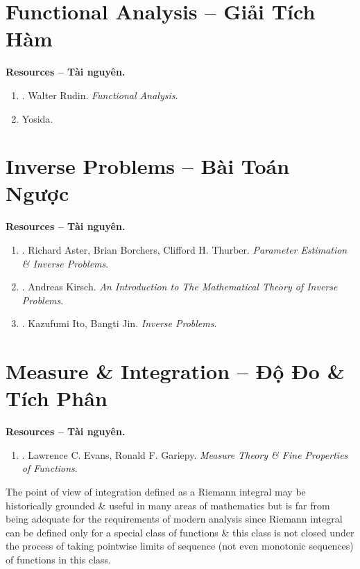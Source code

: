 \documentclass{article}
\begin{document}

\section{Functional Analysis -- Giải Tích Hàm}
\textbf{\textsf{Resources -- Tài nguyên.}}
\begin{enumerate}
	\item \cite{Rudin1991}. {\sc Walter Rudin}. {\it Functional Analysis}.
	\item {\sc Yosida}.
\end{enumerate}


\section{Inverse Problems -- Bài Toán Ngược}
\textbf{\textsf{Resources -- Tài nguyên.}}
\begin{enumerate}
	\item \cite{Aster_Borchers_Thurber2018}. {\sc Richard Aster, Brian Borchers, Clifford H. Thurber}. {\it Parameter Estimation \& Inverse Problems}.
	\item \cite{Kirsch2021}. {\sc Andreas Kirsch}. {\it An Introduction to The Mathematical Theory of Inverse Problems}.
	\item \cite{Ito_Jin2015}. {\sc Kazufumi Ito, Bangti Jin}. {\it Inverse Problems}.
\end{enumerate}


\section{Measure \& Integration -- Độ Đo \& Tích Phân}
\textbf{\textsf{Resources -- Tài nguyên.}}
\begin{enumerate}
	\item \cite{Evans_Gariepy2015}. {\sc Lawrence C. Evans, Ronald F. Gariepy}. {\it Measure Theory \& Fine Properties of Functions}.
\end{enumerate}
The point of view of integration defined as a Riemann integral may be historically grounded \& useful in many areas of mathematics but is far from being adequate for the requirements of modern analysis since Riemann integral can be defined only for a special class of functions \& this class is not closed under the process of taking pointwise limits of sequence (not even monotonic sequences) of functions in this class.
\end{document}
